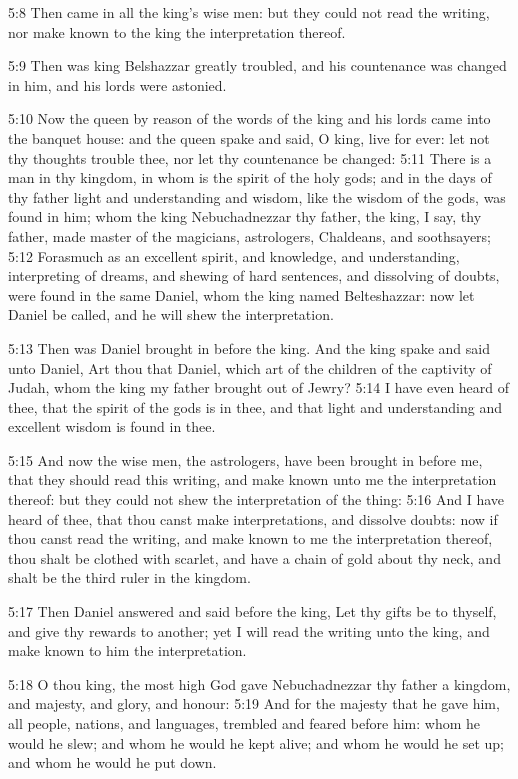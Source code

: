 5:8 Then came in all the king's wise men: but they could not read the writing, nor make known to the king the interpretation thereof.

5:9 Then was king Belshazzar greatly troubled, and his countenance was changed in him, and his lords were astonied.

5:10 Now the queen by reason of the words of the king and his lords came into the banquet house: and the queen spake and said, O king, live for ever: let not thy thoughts trouble thee, nor let thy countenance be changed: 5:11 There is a man in thy kingdom, in whom is the spirit of the holy gods; and in the days of thy father light and understanding and wisdom, like the wisdom of the gods, was found in him; whom the king Nebuchadnezzar thy father, the king, I say, thy father, made master of the magicians, astrologers, Chaldeans, and soothsayers; 5:12 Forasmuch as an excellent spirit, and knowledge, and understanding, interpreting of dreams, and shewing of hard sentences, and dissolving of doubts, were found in the same Daniel, whom the king named Belteshazzar: now let Daniel be called, and he will shew the interpretation.

5:13 Then was Daniel brought in before the king. And the king spake and said unto Daniel, Art thou that Daniel, which art of the children of the captivity of Judah, whom the king my father brought out of Jewry?  5:14 I have even heard of thee, that the spirit of the gods is in thee, and that light and understanding and excellent wisdom is found in thee.

5:15 And now the wise men, the astrologers, have been brought in before me, that they should read this writing, and make known unto me the interpretation thereof: but they could not shew the interpretation of the thing: 5:16 And I have heard of thee, that thou canst make interpretations, and dissolve doubts: now if thou canst read the writing, and make known to me the interpretation thereof, thou shalt be clothed with scarlet, and have a chain of gold about thy neck, and shalt be the third ruler in the kingdom.

5:17 Then Daniel answered and said before the king, Let thy gifts be to thyself, and give thy rewards to another; yet I will read the writing unto the king, and make known to him the interpretation.

5:18 O thou king, the most high God gave Nebuchadnezzar thy father a kingdom, and majesty, and glory, and honour: 5:19 And for the majesty that he gave him, all people, nations, and languages, trembled and feared before him: whom he would he slew; and whom he would he kept alive; and whom he would he set up; and whom he would he put down.

